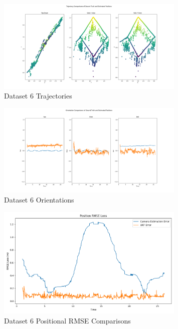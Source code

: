 \documentclass{article}
\begin{document}
\begin{figure}[H]
    \centering
    \includegraphics[width=0.8\textwidth]{./imgs/task4/studentdata6_ukf_positions.png}
    \caption{Dataset 6 Trajectories}
\end{figure}

\begin{figure}[H]
    \centering
    \includegraphics[width=0.8\textwidth]{./imgs/task4/studentdata6_ukf_orientations.png}
    \caption{Dataset 6 Orientations}
\end{figure}

\begin{figure}[H]
    \centering
    \includegraphics[width=0.8\textwidth]{./imgs/task4/studentdata6_ukf_position_rmse.png}
    \caption{Dataset 6 Positional RMSE Comparisons}
\end{figure}
\end{document}
